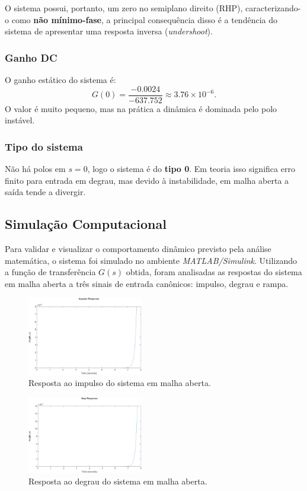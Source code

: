 \documentclass[9pt,a4paper,twocolumn,twoside]{tau-class/tau}
\begin{document}
O sistema possui, portanto, um zero no semiplano direito (RHP), caracterizando-o como \textbf{não mínimo-fase}, a principal consequência
disso é a tendência do sistema de apresentar uma resposta inversa (\textit{undershoot}).

\subsubsection*{Ganho DC}
O ganho estático do sistema é: \[G(0)=\frac{-0.0024}{-637.752}\approx 3.76\times 10^{-6}.\] O valor é muito pequeno, mas na prática
a dinâmica é dominada pelo polo instável.

\subsubsection*{Tipo do sistema}
Não há polos em $s=0$, logo o sistema é do \textbf{tipo 0}. Em teoria isso significa erro finito para entrada em degrau,
mas devido à instabilidade, em malha aberta a saída tende a divergir.

\subsection{Simulação Computacional}
Para validar e visualizar o comportamento dinâmico previsto pela análise matemática, o sistema foi simulado no ambiente
\textit{MATLAB/Simulink}. Utilizando a função de transferência \(G(s)\) obtida, foram analisadas as respostas do sistema
em malha aberta a três sinais de entrada canônicos: impulso, degrau e rampa.

\begin{figure}[H]
    \centering
    \includegraphics[width=0.45\textwidth]{figures/impulse_response.png}
    \caption{Resposta ao impulso do sistema em malha aberta.}
    \label{fig:impulse}
\end{figure}

\begin{figure}[H]
    \centering
    \includegraphics[width=0.45\textwidth]{figures/step_response.png}
    \caption{Resposta ao degrau do sistema em malha aberta.}
    \label{fig:step}
\end{figure}
\end{document}
